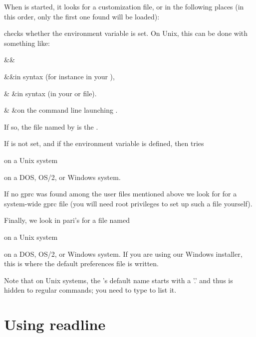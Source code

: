 When  is started, it looks for a customization file, or  in
the following places (in this order, only the first one found will be
loaded):

\noindent\item {} checks whether the environment variable
 is set. On Unix, this can be done with something like: \smallskip

\settabs\+\indent&\quad&\cr

\+&\quad&in  syntax
(for instance in your ),\cr

\+& &in  syntax
(in your  or  file).\cr

\+& &on the command line launching .\cr

\noindent If so, the file named by  is the .

\noindent\item If  is not set, and if the environment variable
 is defined,  then tries

 on a Unix system

 on a DOS, OS/2, or Windows system.

\noindent\item If no gprc was found among the user files mentioned above
we look for  for a system-wide gprc file (you will need root
privileges to set up such a file yourself).

\noindent\item Finally, we look in pari's  for a file named

 on a Unix system

 on a DOS, OS/2, or Windows system. If you are using our
Windows installer, this is where the default preferences file is written.

\noindent Note that on Unix systems, the 's default name starts
with a '.' and thus is hidden to regular  commands; you need to type
 to list it.


\section{Using readline} 

